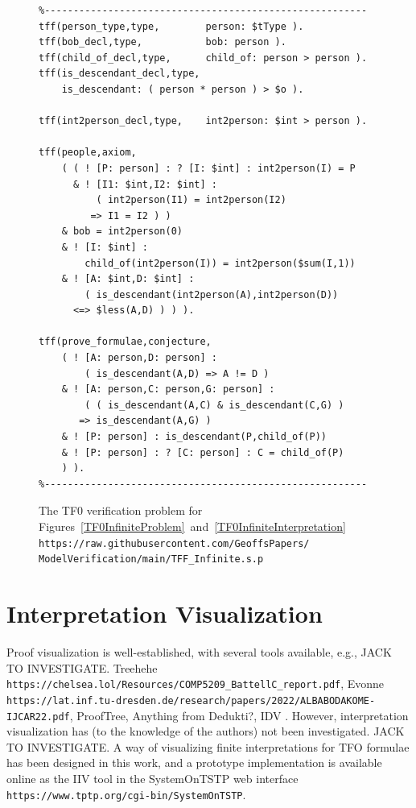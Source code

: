 \documentclass[letterpaper]{article}
\newcommand{\smalltt}[1]{\small \texttt{#1}}
\begin{document}
\begin{figure}[htbp]
\scriptsize
{}
\begin{verbatim}
%--------------------------------------------------------
tff(person_type,type,        person: $tType ).
tff(bob_decl,type,           bob: person ).
tff(child_of_decl,type,      child_of: person > person ).
tff(is_descendant_decl,type, 
    is_descendant: ( person * person ) > $o ).

tff(int2person_decl,type,    int2person: $int > person ).

tff(people,axiom,
    ( ( ! [P: person] : ? [I: $int] : int2person(I) = P
      & ! [I1: $int,I2: $int] : 
          ( int2person(I1) = int2person(I2) 
         => I1 = I2 ) )
    & bob = int2person(0)
    & ! [I: $int] : 
        child_of(int2person(I)) = int2person($sum(I,1))
    & ! [A: $int,D: $int] : 
        ( is_descendant(int2person(A),int2person(D)) 
      <=> $less(A,D) ) ) ).

tff(prove_formulae,conjecture,
    ( ! [A: person,D: person] : 
        ( is_descendant(A,D) => A != D )
    & ! [A: person,C: person,G: person] :
        ( ( is_descendant(A,C) & is_descendant(C,G) )
       => is_descendant(A,G) )
    & ! [P: person] : is_descendant(P,child_of(P))
    & ! [P: person] : ? [C: person] : C = child_of(P) 
    ) ).
%--------------------------------------------------------
\end{verbatim}
\caption{The TF0 verification problem for 
Figures~\ref{TF0InfiniteProblem}~and~\ref{TF0InfiniteInterpretation}\\
{\scriptsize {\tt https://raw.githubusercontent.com/GeoffsPapers/\\
ModelVerification/main/TFF\_Infinite.s.p}}}
\label{TF0InfiniteVerification}
\end{figure}

\section{Interpretation Visualization}
\label{Visualization}

Proof visualization is well-established, with several tools available, e.g., 
JACK TO INVESTIGATE.
Treehehe {\smalltt{https://chelsea.lol/Resources/COMP5209\_BattellC\_report.pdf}},
Evonne {\smalltt{https://lat.inf.tu-dresden.de/research/papers/2022/ALBABODAKOME-IJCAR22.pdf}},
ProofTree,
Anything from Dedukti?,
IDV \cite{TPS07}.
However, interpretation visualization has (to the knowledge of the authors) not been investigated.
JACK TO INVESTIGATE.
A way of visualizing finite interpretations for TFO formulae has been designed in this work, and 
a prototype implementation is available online as the IIV tool in the SystemOnTSTP 
\cite{Sut07-CSR} web interface {\smalltt{https://www.tptp.org/cgi-bin/SystemOnTSTP}}.
\end{document}

